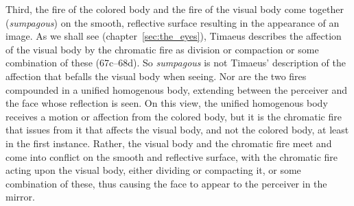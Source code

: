 Third, the fire of the colored body and the fire of the visual body come together (\emph{sumpagous}) on the smooth, reflective surface resulting in the appearance of an image. As we shall see (chapter~\ref{sec:the_eyes}), Timaeus describes the affection of the visual body by the chromatic fire as division  or compaction or some combination of these (67c–68d). So \emph{sumpagous} is not Timaeus' description of the affection that befalls the visual body when seeing. Nor are the two fires compounded in a unified homogenous body, extending between the perceiver and the face whose reflection is seen. On this view, the unified homogenous body receives a motion or affection from the colored body, but it is the chromatic fire that issues from it that affects the visual body, and not the colored body, at least in the first instance.  Rather, the visual body and the chromatic fire meet and come into conflict on the smooth and reflective surface, with the chromatic fire acting upon the visual body, either dividing or compacting it, or some combination of these, thus causing the face to appear to the perceiver in the mirror.

